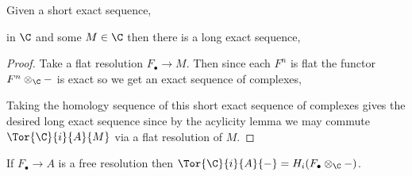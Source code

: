\documentclass[12pt]{article}
\begin{document}
\begin{prop}
Given a short exact sequence,
\begin{center}
\end{center}
in $\C$ and some $M \in \C$ then there is a long exact sequence, 
\begin{center}
\end{center}
\end{prop}

\begin{proof}
Take a flat resolution $F_\bullet \to M$. Then since each $F^n$ is flat the functor $F^n \otimes_\C -$ is exact so we get an exact sequence of complexes,
\begin{center}
\end{center}
Taking the homology sequence of this short exact sequence of complexes gives the desired long exact sequence since by the acylicity lemma we may commute $\Tor{\C}{i}{A}{M}$ via a flat resolution of $M$.  
\end{proof}

\begin{lemma}
If $F_\bullet \to A$ is a free resolution then $\Tor{\C}{i}{A}{-} = H_i(F_\bullet \otimes_\C -)$.
\end{lemma}
\end{document}
